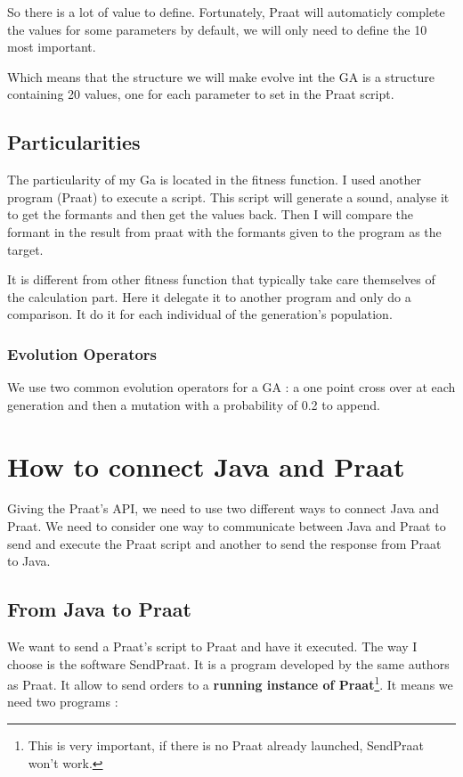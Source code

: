 \documentclass[12pt]{report}
\begin{document}
So there is a lot of value to define. Fortunately, Praat will automaticly complete the values for some parameters by default, we will only need to define the 10 most important.

Which means that the structure we will make evolve int the GA is a structure containing 20 values, one for each parameter to set in the Praat script.

\section{Particularities}
The particularity of my Ga is located in the fitness function. I used another program (Praat) to execute a script. This script will generate a sound, analyse it to get the formants and then get the values back. Then I will compare the formant in the result from praat with the formants given to the program as the target.

It is different from other fitness function that typically take care themselves of the calculation part. Here it delegate it to another program and only do a comparison.
It do it for each individual of the generation's population.

\subsection{Evolution Operators}
We use two common evolution operators for a GA : a one point cross over at each generation and then a mutation with a probability of 0.2 to append.

\chapter{How to connect Java and Praat}
Giving the Praat's API, we need to use two different ways to connect Java and Praat.
We need to consider one way to communicate between Java and Praat to send and execute the Praat script and another to send the response from Praat to Java.

\section{From Java to Praat}
We want to send a Praat's script to Praat and have it executed. The way I choose is the software SendPraat\cite{ref}. It is a program developed by the same authors as Praat. It allow to send orders to a {\bfseries running instance of Praat}\footnote{This is very important, if there is no Praat already launched, SendPraat won't work.}.
It means we need two programs :
\end{document}
